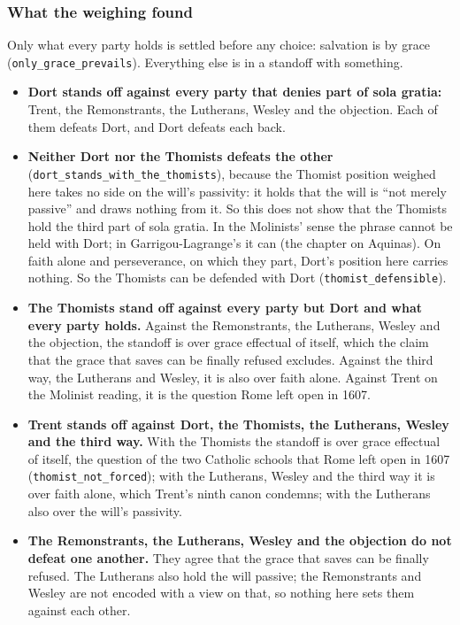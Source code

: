 \documentclass[11pt]{article}
\begin{document}
\subsubsection*{What the weighing found}
Only what every party holds is settled before any choice: salvation is by grace (\texttt{only\_\allowbreak{}grace\_\allowbreak{}prevails}). Everything else is in a standoff with something.

\begin{itemize}
  \item \textbf{Dort stands off against every party that denies part of sola gratia:} Trent, the Remonstrants, the Lutherans, Wesley and the objection. Each of them defeats Dort, and Dort defeats each back.
  \item \textbf{Neither Dort nor the Thomists defeats the other} (\texttt{dort\_\allowbreak{}stands\_\allowbreak{}with\_\allowbreak{}the\_\allowbreak{}thomists}), because the Thomist position weighed here takes no side on the will’s passivity: it holds that the will is “not merely passive” and draws nothing from it. So this does not show that the Thomists hold the third part of sola gratia. In the Molinists’ sense the phrase cannot be held with Dort; in Garrigou-Lagrange’s it can (the chapter on Aquinas). On faith alone and perseverance, on which they part, Dort’s position here carries nothing. So the Thomists can be defended with Dort (\texttt{thomist\_\allowbreak{}defensible}).
  \item \textbf{The Thomists stand off against every party but Dort and what every party holds.} Against the Remonstrants, the Lutherans, Wesley and the objection, the standoff is over grace effectual of itself, which the claim that the grace that saves can be finally refused excludes. Against the third way, the Lutherans and Wesley, it is also over faith alone. Against Trent on the Molinist reading, it is the question Rome left open in 1607.
  \item \textbf{Trent stands off against Dort, the Thomists, the Lutherans, Wesley and the third way.} With the Thomists the standoff is over grace effectual of itself, the question of the two Catholic schools that Rome left open in 1607 (\texttt{thomist\_\allowbreak{}not\_\allowbreak{}forced}); with the Lutherans, Wesley and the third way it is over faith alone, which Trent’s ninth canon condemns; with the Lutherans also over the will’s passivity.
  \item \textbf{The Remonstrants, the Lutherans, Wesley and the objection do not defeat one another.} They agree that the grace that saves can be finally refused. The Lutherans also hold the will passive; the Remonstrants and Wesley are not encoded with a view on that, so nothing here sets them against each other.

\end{itemize}
\end{document}
